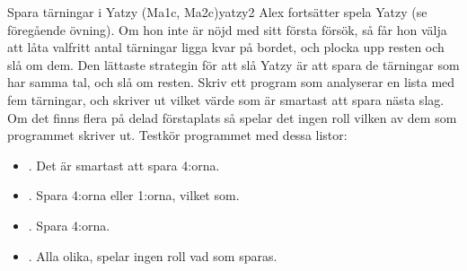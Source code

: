 \begin{matteovningm}{Spara tärningar i Yatzy (Ma1c, Ma2c)}{yatzy2}
Alex fortsätter spela Yatzy (se föregående övning). Om hon inte är nöjd med sitt första försök, så får hon välja att låta valfritt antal tärningar ligga kvar på bordet, och plocka upp resten och slå om dem. Den lättaste strategin för att slå Yatzy är att spara de tärningar som har samma tal, och slå om resten.
\newline
\newline
Skriv ett program som analyserar en lista med fem tärningar, och skriver ut vilket värde som är smartast att spara nästa slag. Om det finns flera på delad förstaplats så spelar det ingen roll vilken av dem som programmet skriver ut. Testkör programmet med dessa listor:

\begin{itemize}
\item \cw{[1 4 5 4 3]}. Det är smartast att spara 4:orna.
\item \cw{[1 4 5 4 1]}. Spara 4:orna eller 1:orna, vilket som.
\item \cw{[1 4 4 4 1]}. Spara 4:orna.
\item \cw{[1 4 5 6 3]}. Alla olika, spelar ingen roll vad som sparas.
\end{itemize}
\end{matteovningm}
\newpage
